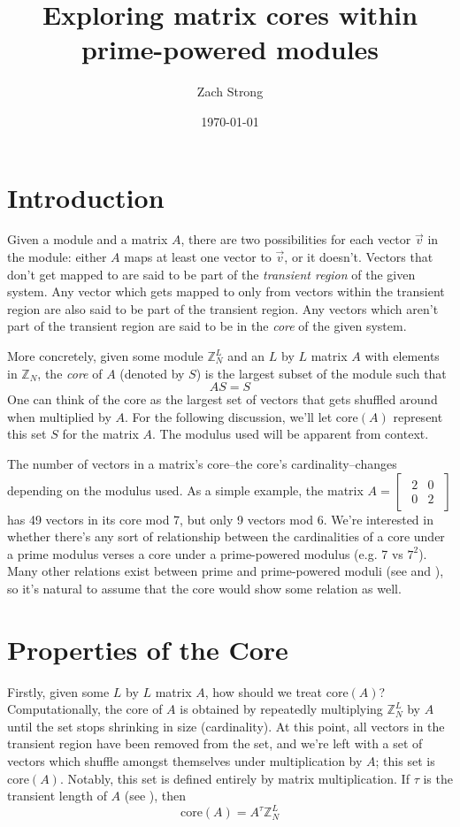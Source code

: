 \documentclass[a4paper, 12pt, reqno]{amsart}
\author{Zach Strong}
\title{Exploring matrix cores within prime-powered modules}
\date{\today}
\newcommand{\ssection}[1]{\vspace{1cm}\section{#1}}
\begin{document}
	\maketitle
	
	\ssection{Introduction}
	Given a module and a matrix $A$, there are two possibilities for each vector $\vec{v}$ in the module: 
	either $A$ maps at least one vector to $\vec{v}$, or it doesn't. Vectors that don't get mapped to are 
	said to be part of the \emph{transient region} of the given system. Any vector which gets mapped to 
	only from vectors within the transient region are also said to be part of the transient region. Any 
	vectors which aren't part of the transient region are said to be in the \emph{core} of the given system.
	
	More concretely, given some module $\mathds{Z}_{N}^{L}$ and an $L$ by $L$ matrix $A$ with elements 
	in $\mathds{Z}_{N}$, the \emph{core} of $A$ (denoted by $S$) is the largest subset of the module such that
	\[
		AS = S
	\]
	One can think of the core as the largest set of vectors that gets shuffled around when multiplied by $A$.
	For the following discussion, we'll let core$(A)$ represent this set $S$ for the matrix $A$. The modulus 
	used will be apparent from context.
	
	The number of vectors in a matrix's core--the core's cardinality--changes depending on the modulus used. As a
	simple example, the matrix $A = 
		\begin{bmatrix}
			\begin{smallmatrix}
				2 & 0 \\
				0 & 2
			\end{smallmatrix}
		\end{bmatrix}
	$
	has 49 vectors in its core mod 7, but only 9 vectors mod 6. We're interested in whether there's any sort of
	relationship between the cardinalities of a core under a prime modulus verses a core under a prime-powered modulus
	(e.g. 7 vs $7^2$). Many other relations exist between prime and prime-powered moduli (see \citet{Patterson2008}
	and \citet{Mendivil2012}), so it's natural to assume that the core would show some relation as well.
	
	\ssection{Properties of the Core}
	Firstly, given some $L$ by $L$ matrix $A$, how should we treat core$(A)$? Computationally, the core of $A$ is
	obtained by repeatedly multiplying $\mathds{Z}_{N}^{L}$ by $A$ until the set stops shrinking in size (cardinality). 
	At this point, all vectors in the transient region have been removed from the set, and we're left with a set of 
	vectors which shuffle amongst themselves under multiplication by $A$; this set is core$(A)$. Notably, this set 
	is defined entirely by matrix multiplication. If $\tau$ is the transient length of $A$ (see \citet{Strong2022maximal}), 
	then
	\[
		\text{core}(A) = A^{\tau}\mathds{Z}_{N}^{L}
	\]
	
\end{document}
